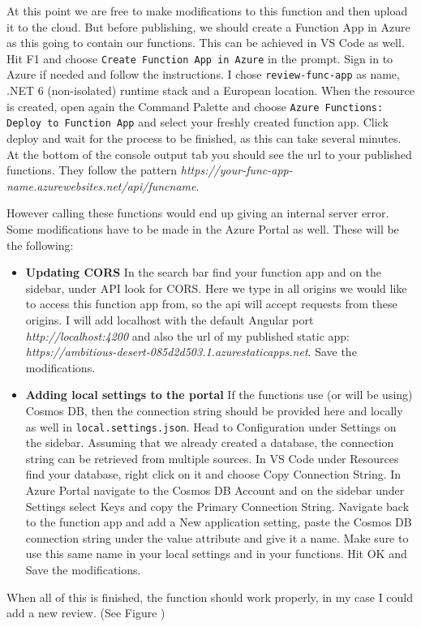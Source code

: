 At this point we are free to make modifications to this function and then upload it to the cloud. But before publishing, we should create a Function App in Azure as this going to contain our functions. This can be achieved in VS Code as well. Hit F1 and choose \verb+Create Function App in Azure+ in the prompt. Sign in to Azure if needed and follow the instructions. I chose \verb+review-func-app+ as name, .NET 6 (non-isolated) runtime stack and a European location. When the resource is created, open again the Command Palette and choose \verb+Azure Functions: Deploy to Function App+ and select your freshly created function app. Click deploy and wait for the process to be finished, as this can take several minutes. At the bottom of the console output tab you should see the url to your published functions. They follow the pattern
\emph{https://your-func-app-name.azurewebsites.net/api/funcname}.

However calling these functions would end up giving an internal server error. Some modifications have to be made in the Azure Portal as well. These will be the following:
\begin{itemize}
	\item \textbf{Updating CORS}
	 In the search bar find your function app and on the sidebar, under API look for CORS. Here we type in all origins we would like to access this function app from, so the api will accept requests from these origins. I will add localhost with the default Angular port \emph{http://localhost:4200} and also the url of my published static app: \emph{https://ambitious-desert-085d2d503.1.azurestaticapps.net}. Save the modifications.
	 
	\item \textbf{Adding local settings to the portal}\label{LocalSettings}
	If the functions use (or will be using) Cosmos DB, then the connection string should be provided here and locally as well in \verb+local.settings.json+. Head to Configuration under Settings on the sidebar. Assuming that we already created a database, the connection string can be retrieved from multiple sources. In VS Code under Resources find your database, right click on it and choose Copy Connection String. In Azure Portal navigate to the Cosmos DB Account and on the sidebar under Settings select Keys and copy the Primary Connection String. Navigate back to the function app and add a New application setting, paste the Cosmos DB connection string under the value attribute and give it a name. Make sure to use this same name in your local settings and in your functions. Hit OK and Save the modifications.
\end{itemize}
  When all of this is finished, the function should work properly, in my case I could add a new review. (See Figure )

